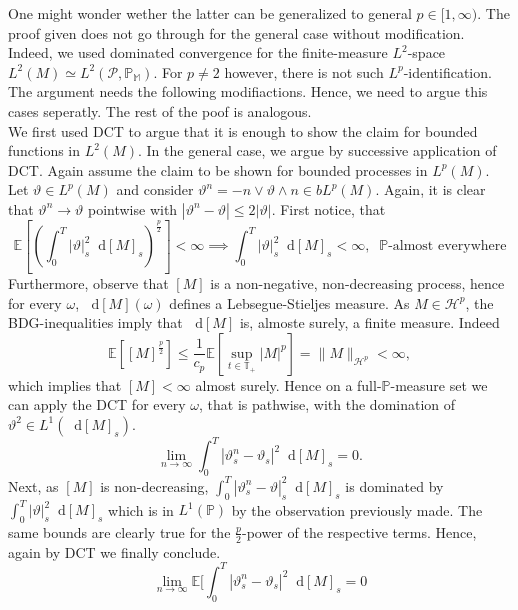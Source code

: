 \documentclass[11pt,a4paper,twoside,openany]{report}
\newcommand{\diff}{\mathop{}\!\mathrm{d}}
\theoremstyle{plain} %
\theoremstyle{definition} %
\theoremstyle{remark} %
\begin{document}
One might wonder wether the latter can be generalized to general \(p\in[1,\infty)\). The proof given does not go through for the general case without modification. Indeed, we used dominated convergence for the finite-measure \(L^2\)-space \(L^2(M)\simeq L^2(\mathcal{P},\mathbb{P_M})\). For \(p\neq 2\) however, there is not such \(L^p\)-identification. The argument needs the following modifiactions. Hence, we need to argue this cases seperatly. The rest of the poof is analogous. 
\\
We first used DCT to argue that it is enough to show the claim for bounded functions in \(L^2(M)\). In the general case, we argue by successive application of DCT. 
Again assume the claim to be shown for bounded processes in \(L^p(M)\). Let \(\vartheta\in L^p(M)\) and consider \(\vartheta^n=-n\vee \vartheta\wedge n\in bL^p(M)\). Again, it is clear that \(\vartheta^n\to\vartheta\) pointwise with \(|\vartheta^n-\vartheta|\leq 2|\vartheta|\). First notice, that 
\begin{equation}
    \mathbb{E}[\left(\int_0^T|\vartheta|_s^2\diff [M]_s\right)^{\frac{p}{2}}]<\infty\implies\int_0^T|\vartheta|_s^2\diff [M]_s<\infty,\;\;\mathbb{P}\text{-almost everywhere}
\end{equation}
 Furthermore, observe that \([M]\) is a non-negative, non-decreasing process, hence for every \(\omega\), \(\diff [M](\omega)\) defines a Lebsegue-Stieljes measure. As \(M\in\mathcal{H}^p\), the BDG-inequalities imply that \(\diff [M]\) is, almoste surely, a finite measure. 
 Indeed
 \begin{equation}
    \mathbb{E}[[M]^{\frac{p}{2}}]\leq \frac{1}{c_p}\mathbb{E}[\sup_{t\in\mathbb{T}_+}|M|^p]=\lVert M\rVert_{\mathcal{H}^p}<\infty,
\end{equation}
which implies that \([M]<\infty\) almost surely. 
Hence on a full-\(\mathbb{P}\)-measure set we can apply the DCT for every \(\omega\), that is pathwise, with the domination of \(\vartheta^2\in L^1(\diff [M]_s) \). 
\begin{equation}
    \lim_{n\to\infty}\int_{0}^T|\vartheta_s^n-\vartheta_s|^2\diff [M]_s=0.
\end{equation}
Next, as \([M]\) is non-decreasing,
\(\int_0^T|\vartheta_s^n-\vartheta|_s^2\diff [M]_s\) is dominated by \(\int_0^T|\vartheta|_s^2\diff [M]_s\) which is in \(L^1(\mathbb{P})\) by the observation previously made. The same bounds are clearly true for the \(\frac{p}{2}\)-power of the respective terms. Hence, again by DCT we finally conclude.
\begin{equation}
    \lim_{n\to\infty}\mathbb{E}[\int_0^T|\vartheta^n_s-\vartheta_s|^2\diff[M]_s=0
\end{equation}
\end{document}
